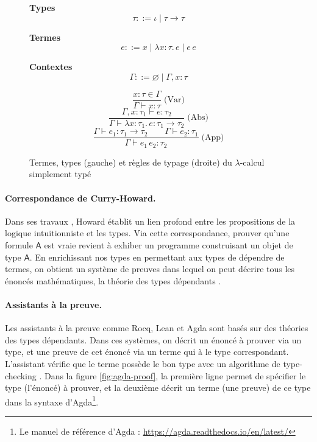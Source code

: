 \documentclass[11pt]{article}
\begin{document}
\begin{figure}[h]
\centering
\begin{minipage}{0.45\textwidth}
\centering
\textbf{Types}
\[
\tau ::= \iota \mid \tau \to \tau
\]

\textbf{Termes}
\[
e ::= x \mid \lambda x : \tau.\, e \mid e\, e
\]

\textbf{Contextes}
\[
\Gamma ::= \varnothing \mid \Gamma, x : \tau
\]
\end{minipage}
\hfill
\begin{minipage}{0.45\textwidth}
\centering
\[
\dfrac{x : \tau \in \Gamma}{\Gamma \vdash x : \tau} \; \text{(Var)}
\]
\vspace{1em}
\[
\dfrac{\Gamma, x : \tau_1 \vdash e : \tau_2}
    {\Gamma \vdash \lambda x : \tau_1.\, e : \tau_1 \to \tau_2} \; \text{(Abs)}
\]
\vspace{1em}
\[
\dfrac{\Gamma \vdash e_1 : \tau_1 \to \tau_2 \qquad \Gamma \vdash e_2 : \tau_1}
      {\Gamma \vdash e_1\, e_2 : \tau_2} \; \text{(App)}
\]
\end{minipage}
\caption{Termes, types (gauche) et règles de typage (droite) du $\lambda$-calcul simplement typé}
\label{fig:stlc}
\end{figure}

\paragraph{Correspondance de Curry-Howard.}
Dans ses travaux \cite{howard1980formulae}, Howard établit un lien profond entre les propositions de la logique intuitionniste et les types.
Via cette correspondance, prouver qu'une formule $\mathsf{A}$ est vraie revient à exhiber un programme construisant un objet de type $\mathsf{A}$.
En enrichissant nos types en permettant aux types de dépendre de termes, 
on obtient un système de preuves dans lequel on peut décrire tous les énoncés mathématiques, la théorie des types dépendants \cite{martinlof1984intuitionistic}.

\paragraph{Assistants à la preuve.}
Les assistants à la preuve comme Rocq, Lean et Agda sont basés sur des théories des types dépendants.
Dans ces systèmes, on décrit un énoncé à prouver via un type, et une preuve de cet énoncé via un terme qui à le type correspondant. 
L'assistant vérifie que le terme possède le bon type avec un algorithme de type-checking \cite{coquand1996algorithm}. 
Dans la figure \ref{fig:agda-proof}, la première ligne permet de spécifier le type (l'énoncé) à prouver, 
et la deuxième décrit un terme (une preuve) de ce type dans la syntaxe d'Agda\footnote{Le manuel de référence d'Agda : \url{https://agda.readthedocs.io/en/latest/}}.
\end{document}
